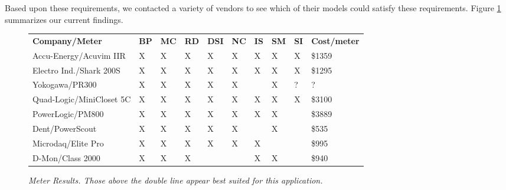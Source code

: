 \documentclass[11pt]{article}
\begin{document}
Based upon these requirements, we contacted a variety of vendors to see
which of their models could satisfy these requirements.  Figure
\ref{fig:meterresults} summarizes our current findings.  

\begin{figure}[!ht]
\small
\begin{tabular}{l l l l l l l l l l } \hline
{\bf Company/Meter }          & {\bf BP } & {\bf MC} & {\bf RD} & {\bf DSI} & {\bf NC} & {\bf IS} & {\bf SM} & {\bf SI} & {\bf Cost/meter}   \\ 
Accu-Energy/Acuvim IIR       &   X           &           X    &           X   &          X    &          X     &         X   &          X    &         X   &        \$1359 \\ 
Electro Ind./Shark 200S        &      X        &           X    &           X   &          X    &          X     &         X   &          X    &         X   &        \$1295 \\ \hline \hline
Yokogawa/PR300                  &      X        &           X    &           X   &          X    &          X     &              &          X    &         ?   &          ? \\  
Quad-Logic/MiniCloset 5C   &   X           &           X    &           X   &          X    &          X     &        X    &          X    &         X   &         \$3100 \\  
PowerLogic/PM800                &      X        &           X    &           X   &          X    &          X     &       X     &          X    &             &          \$3889 \\  
Dent/PowerScout                   &      X        &           X    &           X   &          X    &          X     &              &          X    &             &          \$535 \\  
Microdaq/Elite Pro                 &      X        &           X    &           X   &          X    &          X     &      X     &              &               &          \$995 \\  
D-Mon/Class 2000                 &      X       &           X    &           X   &                &                 &         X    &          X    &              &          \$940 \\  \hline
\end{tabular} 
\normalsize
\caption{{\em Meter Results. Those above the double line appear best suited for this application. }}
\label{fig:meterresults}
\end{figure}
\end{document}
